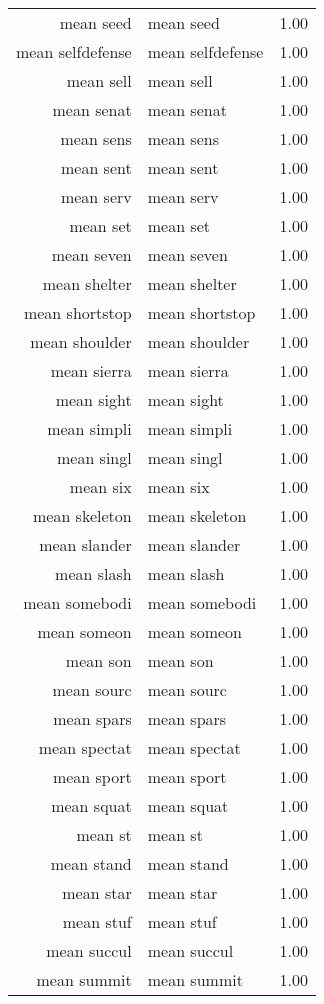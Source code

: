 \begin{table}[ht]
\begin{tabular}{rlr}
  mean seed & mean seed & 1.00 \\ 
  mean selfdefense & mean selfdefense & 1.00 \\ 
  mean sell & mean sell & 1.00 \\ 
  mean senat & mean senat & 1.00 \\ 
  mean sens & mean sens & 1.00 \\ 
  mean sent & mean sent & 1.00 \\ 
  mean serv & mean serv & 1.00 \\ 
  mean set & mean set & 1.00 \\ 
  mean seven & mean seven & 1.00 \\ 
  mean shelter & mean shelter & 1.00 \\ 
  mean shortstop & mean shortstop & 1.00 \\ 
  mean shoulder & mean shoulder & 1.00 \\ 
  mean sierra & mean sierra & 1.00 \\ 
  mean sight & mean sight & 1.00 \\ 
  mean simpli & mean simpli & 1.00 \\ 
  mean singl & mean singl & 1.00 \\ 
  mean six & mean six & 1.00 \\ 
  mean skeleton & mean skeleton & 1.00 \\ 
  mean slander & mean slander & 1.00 \\ 
  mean slash & mean slash & 1.00 \\ 
  mean somebodi & mean somebodi & 1.00 \\ 
  mean someon & mean someon & 1.00 \\ 
  mean son & mean son & 1.00 \\ 
  mean sourc & mean sourc & 1.00 \\ 
  mean spars & mean spars & 1.00 \\ 
  mean spectat & mean spectat & 1.00 \\ 
  mean sport & mean sport & 1.00 \\ 
  mean squat & mean squat & 1.00 \\ 
  mean st & mean st & 1.00 \\ 
  mean stand & mean stand & 1.00 \\ 
  mean star & mean star & 1.00 \\ 
  mean stuf & mean stuf & 1.00 \\ 
  mean succul & mean succul & 1.00 \\ 
  mean summit & mean summit & 1.00 \\ 

\end{tabular}
\end{table}
